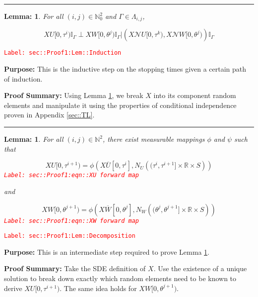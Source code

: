 \documentclass[12pt]{article}
\newcommand{\mb}{\mathbb}
\newcommand{\mc}{\mathcal}
\newcommand{\ov}{\overline}
\newcommand{\tr}{\textcolor{red}}
\newcommand{\labe}[1]{\tr{\texttt{Label: #1}}}
\newcommand{\purpose}{\textbf{Purpose: }}
\newcommand{\pfsum}{\textbf{Proof Summary: }}
\newcommand{\lin}{\rule{\linewidth}{0.4 pt}}
\newcommand{\neigh}{\mc{N}}					%
\renewcommand{\U}{U}							%
\newcommand{\UU}{W}								%
\renewcommand{\S}{S}							%
\newcommand{\X}{X}								%
\newcommand{\cl}{\ov}							%
\newcommand{\poiss}[1]{N_{#1}}						%
\newcommand{\rt}[1]{\tau^{#1}}						%
\newcommand{\rtt}[1]{\theta^{#1}}					%
\renewcommand{\it}{k}								%
\newcommand{\itt}{i}								%
\newcommand{\ittt}{j}								%
\newcommand{\apath}{\Gamma}						%
\newcommand{\pathset}[2]{\Lambda_{#1,#2}}			%
\newtheorem{lem}[thms]{Lemma: }
\begin{document}
\lin

\begin{lem}
For all \((\itt,\ittt)\in \mb{N}_0^2\) and \(\apath \in \pathset{\itt}{\ittt}\),

\[\X{\U}{[0,\rt{\itt})}\mb{I}_{\apath}\perp \X{\UU}{[0,\rtt{\ittt})}\mb{I}_{\apath}|\left(\X{\neigh{\U}}{[0,\rt{\it})},\X{\neigh{\UU}}{[0,\rtt{\ittt})}\right)\mb{I}_{\apath}\]
\label{sec::Proof1:Lem::Induction}
\end{lem}
\labe{sec::Proof1:Lem::Induction}

\purpose This is the inductive step on the stopping times given a certain path of induction.

\pfsum Using Lemma \ref{sec::Proof1:Lem::Decomposition}, we break \(\X{}{}\) into its component random elements and manipulate it using the properties of conditional independence proven in Appendix \ref{sec::TL}.

\lin

\begin{lem}
For all \((\itt,\ittt)\in \mb{N}^2\), there exist measurable mappings \(\phi\) and \(\psi\) such that 

\begin{equation}
\X{\U}{[0,\rt{\itt+1})} = \phi\left(\X{\cl{\U}}{[0,\rt{\itt}]}, \poiss{\U}\left((\rt{\itt}, \rt{\itt+1}]\times \mb{R}\times \S\right)\right)
\label{sec::Proof1:eqn::XU forward map}
\end{equation}
\labe{sec::Proof1:eqn::XU forward map}

and

\begin{equation}
\X{\UU}{[0,\rtt{\ittt+1})} = \phi\left(\X{\cl{\UU}}{[0,\rtt{\ittt}]}, \poiss{\UU}\left((\rtt{\ittt}, \rtt{\ittt+1}]\times \mb{R}\times \S\right)\right)
\label{sec::Proof1:eqn::XW forward map}
\end{equation}
\labe{sec::Proof1:eqn::XW forward map}

\label{sec::Proof1:Lem::Decomposition}
\end{lem}
\labe{sec::Proof1:Lem::Decomposition}

\purpose This is an intermediate step required to prove Lemma \ref{sec::Proof1:Lem::Induction}.

\pfsum Take the SDE definition of \(\X{}{}\). Use the existence of a unique solution to break down exactly which random elements need to be known to derive \(\X{\U}{[0,\rt{\itt+1})}\). The same idea holds for \(\X{\UU}{[0,\rtt{\ittt+1})}\).
\end{document}
